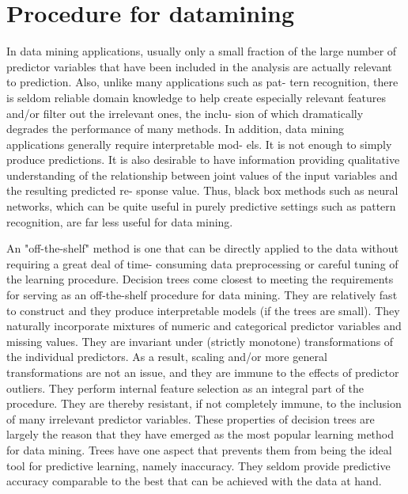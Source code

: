 \documentclass[12pt, letterpaper]{article}
\theoremstyle{definition}
\begin{document}
\section{Procedure for datamining}
In data mining applications, usually only a small fraction of the large number of predictor variables that have been included in the analysis are actually relevant to prediction. Also, unlike many applications such as pat- tern recognition, there is seldom reliable domain knowledge to help create especially relevant features and/or filter out the irrelevant ones, the inclu- sion of which dramatically degrades the performance of many methods.
In addition, data mining applications generally require interpretable mod- els. It is not enough to simply produce predictions. It is also desirable to have information providing qualitative understanding of the relationship between joint values of the input variables and the resulting predicted re- sponse value. Thus, black box methods such as neural networks, which can be quite useful in purely predictive settings such as pattern recognition, are far less useful for data mining.

An "off-the-shelf" method is one that can be directly applied to the data without requiring a great deal of time- consuming data preprocessing or careful tuning of the learning procedure. Decision trees come closest to meeting the requirements for serving as an off-the-shelf procedure for data mining. They are relatively fast to construct and they produce interpretable models (if the trees are small). They naturally incorporate mixtures of numeric and categorical predictor variables and missing values. They are invariant under (strictly monotone) transformations of the individual predictors. As a result, scaling and/or more general transformations are not an issue, and they are immune to the effects of predictor outliers. They perform internal feature selection as an integral part of the procedure. They are thereby resistant, if not completely immune, to the inclusion of many irrelevant predictor variables. These properties of decision trees are largely the reason that they have emerged as the most popular learning method for data mining. Trees have one aspect that prevents them from being the ideal tool for predictive learning, namely inaccuracy. They seldom provide predictive accuracy comparable to the best that can be achieved with the data at hand.
\end{document}

